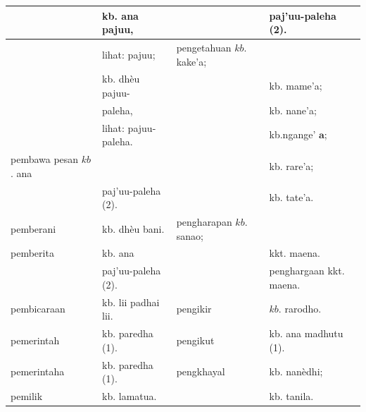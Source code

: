 \documentclass[10pt]{article}
\begin{document}
\begin{center}
\begin{tabular}{|l|l|l|l|}
\hline
 & kb. ana pajuu, &  & paj'uu-paleha (2). \\
\hline
 & lihat: pajuu; & pengetahuan \(k b\). kake'a; &  \\
\hline
 & kb. dhèu pajuu- &  & kb. mame'a; \\
\hline
 & paleha, &  & kb. nane'a; \\
\hline
 & lihat: pajuu-paleha. &  & kb.ngange' \(\boldsymbol{a}\); \\
\hline
pembawa pesan \(k b\). ana &  &  & kb. rare'a; \\
\hline
 & paj'uu-paleha (2). &  & kb. tate'a. \\
\hline
pemberani & kb. dhèu bani. & pengharapan \(k b\). sanao; &  \\
\hline
pemberita & kb. ana &  & kkt. maena. \\
\hline
 & paj'uu-paleha (2). &  & penghargaan kkt. maena. \\
\hline
pembicaraan & kb. lii padhai lii. & pengikir & \(k b\). rarodho. \\
\hline
pemerintah & kb. paredha (1). & pengikut & kb. ana madhutu (1). \\
\hline
pemerintaha & kb. paredha (1). & pengkhayal & kb. nanèdhi; \\
\hline
pemilik & kb. lamatua. &  & kb. tanila. \\
\hline
\end{tabular}
\end{center}
\end{document}
